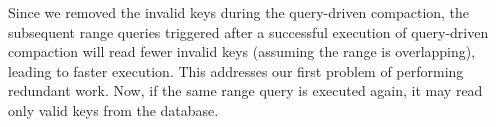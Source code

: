 Since we removed the invalid keys during the query-driven compaction, the subsequent range queries triggered after a 
successful execution of query-driven compaction will read fewer invalid keys (assuming the range is overlapping), 
leading to faster execution. This addresses our first problem of performing redundant work. Now, if the same range 
query is executed again, it may read only valid keys from the database.







